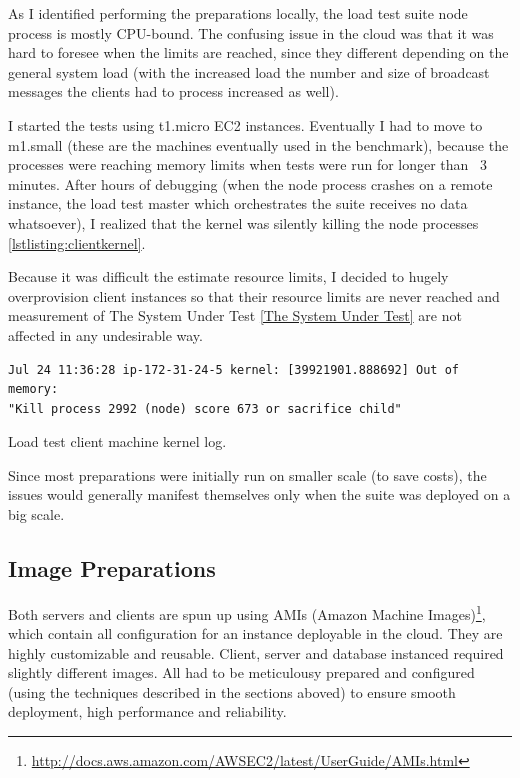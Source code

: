 \documentclass{uvamscse}
\begin{document}
As I identified performing the preparations locally, the load test suite node process is mostly CPU-bound. The confusing issue in the cloud was that it was hard to foresee when the limits are reached, since they different depending on the general system load (with the increased load the number and size of broadcast messages the clients had to process increased as well).

I started the tests using t1.micro EC2 instances. Eventually I had to move to m1.small (these are the machines eventually used in the benchmark), because the processes were reaching memory limits when tests were run for longer than ~3 minutes. After hours of debugging (when the node process crashes on a remote instance, the load test master which orchestrates the suite receives no data whatsoever), I realized that the kernel was silently killing the node processes \ref{lstlisting:clientkernel}.

Because it was difficult the estimate resource limits, I decided to hugely overprovision client instances so that their resource limits are never reached and measurement of The System Under Test \ref{The System Under Test} are not affected in any undesirable way.

\begin{sourcecode}[h]
\begin{lstlisting}[style=mono]
Jul 24 11:36:28 ip-172-31-24-5 kernel: [39921901.888692] Out of memory:
"Kill process 2992 (node) score 673 or sacrifice child"
\end{lstlisting}
\caption{Load test client machine kernel log.}
\label{lstlisting:clientkernel}
\end{sourcecode}

Since most preparations were initially run on smaller scale (to save costs), the issues would generally manifest themselves only when the suite was deployed on a big scale.

\subsection{Image Preparations}
Both servers and clients are spun up using AMIs (Amazon Machine Images)\footnote{\url{http://docs.aws.amazon.com/AWSEC2/latest/UserGuide/AMIs.html}}, which contain all configuration for an instance deployable in the cloud. They are highly customizable and reusable. Client, server and database instanced required slightly different images. All had to be meticulousy prepared and configured (using the techniques described in the sections aboved) to ensure smooth deployment, high performance and reliability.
\end{document}
